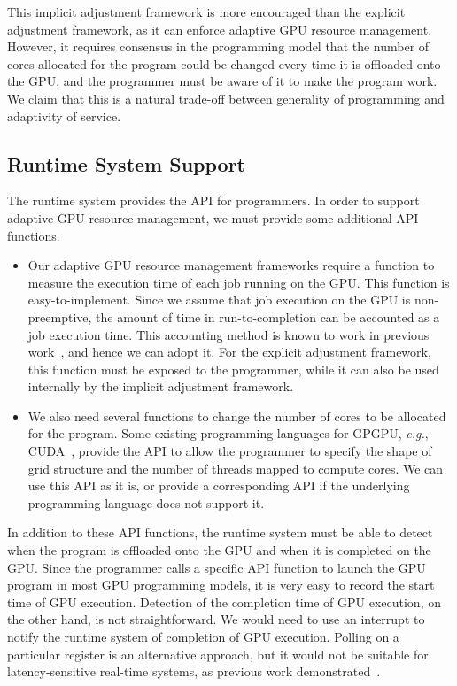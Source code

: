 \documentclass[times, 10pt, twocolumn]{article}
\begin{document}
This implicit adjustment framework is more encouraged than the explicit
adjustment framework, as it can enforce adaptive GPU resource
management.
However, it requires consensus in the programming model that the number
of cores allocated for the program could be changed every time it is
offloaded onto the GPU, and the programmer must be aware of it to make
the program work.
We claim that this is a natural trade-off between generality of
programming and adaptivity of service.

\subsection{Runtime System Support}
\label{sec:runtime}

The runtime system provides the API for programmers.
In order to support adaptive GPU resource management, we must provide
some additional API functions.

\begin{itemize}
 \item Our adaptive GPU resource management frameworks require a
       function to measure the execution time of each job running on the
       GPU.
       This function is easy-to-implement.
       Since we assume that job execution on the GPU is non-preemptive,
       the amount of time in run-to-completion can be accounted as a job
       execution time.
       This accounting method is known to work in previous
       work~\cite{Kato_ATC11, Rossbach_SOSP11}, and hence we can adopt
       it.
       For the explicit adjustment framework, this function must be
       exposed to the programmer, while it can also be used internally
       by the implicit adjustment framework.
 \item We also need several functions to change the number of cores to
       be allocated for the program.
       Some existing programming languages for GPGPU, \textit{e.g.},
       CUDA~\cite{CUDA}, provide the API to allow the programmer to
       specify the shape of grid structure and the number of threads
       mapped to compute cores.
       We can use this API as it is, or provide a corresponding API if
       the underlying programming language does not support it.
\end{itemize}

In addition to these API functions, the runtime system must be able to
detect when the program is offloaded onto the GPU and when it is
completed on the GPU.
Since the programmer calls a specific API function to launch the GPU
program in most GPU programming models, it is very easy to record the
start time of GPU execution.
Detection of the completion time of GPU execution, on the other hand, is
not straightforward.
We would need to use an interrupt to notify the runtime system of
completion of GPU execution.
Polling on a particular register is an alternative approach, but it
would not be suitable for latency-sensitive real-time systems, as
previous work demonstrated~\cite{Kato_ATC11}.
\end{document}
